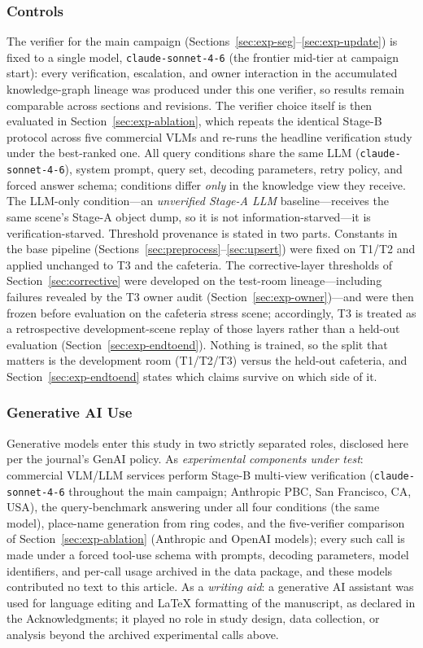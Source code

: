 \documentclass[electronics,article,accept,pdftex,moreauthors]{Definitions/mdpi}
\begin{document}
\subsubsection{Controls}
The verifier for the main campaign (Sections~\ref{sec:exp-seg}--\ref{sec:exp-update}) is fixed to a single
model, \texttt{claude-\hspace{0pt}sonnet-\hspace{0pt}4-6} (the frontier
mid-tier at campaign start):
every verification, escalation, and owner interaction in the accumulated
knowledge-graph lineage was produced under this one verifier, so results
remain comparable across sections and revisions. The verifier choice itself
is then evaluated in Section~\ref{sec:exp-ablation}, which repeats the
identical Stage-B protocol across five commercial VLMs and re-runs the
headline verification study under the best-ranked one.
All query conditions share the same LLM (\texttt{claude-sonnet-4-6}), system
prompt, query set, decoding parameters, retry policy, and forced answer
schema; conditions differ \emph{only} in the knowledge view they receive.
The LLM-only condition---an \emph{unverified Stage-A LLM} baseline---receives the same scene's Stage-A object dump, so it
is not information-starved---it is verification-starved.
Threshold provenance is stated in two parts. Constants in the base
pipeline (Sections~\ref{sec:preprocess}--\ref{sec:upsert}) were fixed on
T1/T2 and applied unchanged to T3 and the cafeteria. The corrective-layer
thresholds of Section~\ref{sec:corrective} were developed on the test-room
lineage---including failures revealed by the T3 owner audit
(Section~\ref{sec:exp-owner})---and were then frozen before evaluation on
the cafeteria stress scene; accordingly, T3 is treated as a retrospective
development-scene replay of those layers rather than a held-out
evaluation (Section~\ref{sec:exp-endtoend}). Nothing is trained, so the
split that matters is the development room (T1/T2/T3) versus the
held-out cafeteria, and Section~\ref{sec:exp-endtoend} states which claims
survive on which side of it.

\subsubsection{Generative AI Use}
Generative models enter this study in two strictly separated roles,
disclosed here per the journal's GenAI policy. As \emph{experimental
components under test}: commercial VLM/LLM services perform Stage-B
multi-view verification (\texttt{claude-sonnet-4-6} throughout the main
campaign; Anthropic PBC, San Francisco, CA, USA), the query-benchmark
answering under all four conditions (the same model), place-name
generation from ring codes, and the five-verifier comparison of
Section~\ref{sec:exp-ablation} (Anthropic and OpenAI models); every such
call is made under a forced tool-use schema with prompts, decoding
parameters, model identifiers, and per-call usage archived in the data
package, and these models contributed no text to this article. As a
\emph{writing aid}: a generative AI assistant was used for language
editing and LaTeX formatting of the manuscript, as declared in the
Acknowledgments; it played no role in study design, data collection, or
analysis beyond the archived experimental calls above.
\end{document}
